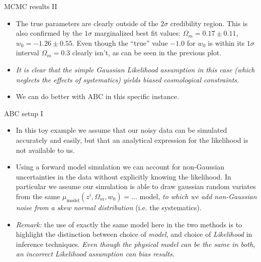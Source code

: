 \documentclass{beamer}
\theoremstyle{remark}
\newcommand{\nologo}{\setbeamertemplate{logo}{}} %
\begin{document}
\begin{frame}{MCMC results II}
\begin{itemize}[<+->]
    \item The true parameters are clearly outside of the $2\sigma$ credibility region. This is also confirmed by the $1\sigma$ marginalized best fit values: $\Omega_m = 0.17\pm 0.11$, $w_0 = -1.26\pm 0.55$. Even though the ``true'' value $-1.0$ for $w_0$ is within its $1\sigma$ interval $\Omega_m = 0.3$ clearly isn't, as can be seen in the previous plot.
    \item \emph{It is clear that the simple Gaussian Likelihood assumption in this case (which neglects the effects of systematics) yields biased cosmological constraints.}
    \item We can do better with ABC in this specific instance.
\end{itemize}
\end{frame}

{\nologo
\begin{frame}{ABC setup I}
\begin{itemize}[<+->]
    \item In this toy example we assume that our noisy data can be simulated accurately and easily, but that an analytical expression for the likelihood is not available to us.
    \item Using a forward model simulation we can account for non-Gaussian uncertainties in the data without explicitly knowing the likelihood. In particular we assume our simulation is able to draw gaussian random variates from the same $\mu_{\text{model}}(z^i, \Omega_m, w_0) = \dots$ model, \emph{to which we add non-Gaussian noise from a skew normal distribution} (i.e. the systematics).
    \item \emph{Remark:} the use of exactly the same model here in the two methods is to highlight the distinction between choice of \emph{model}, and choice of \emph{Likelihood} in inference techniques. \emph{Even though the physical model can be the same in both, an incorrect Likelihood assumption can bias results.}
\end{itemize}
\end{frame}
}
\end{document}
